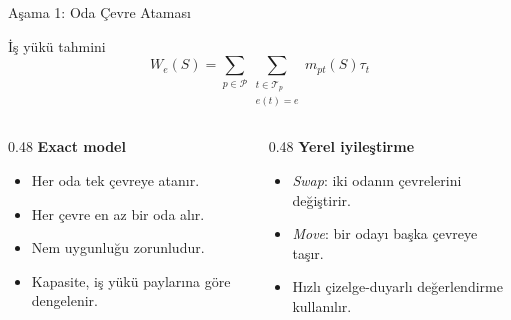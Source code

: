 \documentclass[aspectratio=169,11pt]{beamer}
\begin{document}
\begin{frame}{Aşama 1: Oda Çevre Ataması}
  \begin{block}{İş yükü tahmini}
    \[
    W_e(S)=\sum_{p\in\mathcal{P}}
    \sum_{\substack{t\in\mathcal{T}_p\\e(t)=e}}
    m_{pt}(S)\tau_t
    \]
  \end{block}

  \begin{columns}[T,totalwidth=\textwidth]
    \begin{column}{0.48\textwidth}
      \textbf{Exact model}
      \begin{itemize}
        \item Her oda tek çevreye atanır.
        \item Her çevre en az bir oda alır.
        \item Nem uygunluğu zorunludur.
        \item Kapasite, iş yükü paylarına göre dengelenir.
      \end{itemize}
    \end{column}
    \begin{column}{0.48\textwidth}
      \textbf{Yerel iyileştirme}
      \begin{itemize}
        \item \textit{Swap}: iki odanın çevrelerini değiştirir.
        \item \textit{Move}: bir odayı başka çevreye taşır.
        \item Hızlı çizelge-duyarlı değerlendirme kullanılır.
      \end{itemize}
    \end{column}
  \end{columns}
\end{frame}
\end{document}
